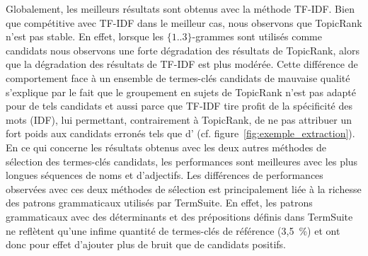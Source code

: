     Globalement, les meilleurs résultats sont obtenus avec la méthode TF-IDF.
    Bien que compétitive avec TF-IDF dans le meilleur cas, nous observons que
    TopicRank n'est pas stable. En effet, lorsque les $\{1..3\}$-grammes sont
    utilisés comme candidats nous observons une forte dégradation des résultats
    de TopicRank, alors que la dégradation des résultats de TF-IDF est plus
    modérée. Cette différence de comportement face à un ensemble de termes-clés
    candidats de mauvaise qualité s'explique par le fait que le groupement en
    sujets de TopicRank n'est pas adapté pour de tels candidats et aussi parce
    que TF-IDF tire profit de la spécificité des mots (IDF), lui permettant,
    contrairement à TopicRank, de ne pas attribuer un fort poids aux candidats
    erronés tels que \og{}d'\fg{} (cf. figure~\ref{fig:exemple_extraction}). En
    ce qui concerne les résultats obtenus avec les deux autres méthodes de
    sélection des termes-clés candidats, les performances sont meilleures avec
    les plus longues séquences de noms et d'adjectifs. Les différences de
    performances observées avec ces deux méthodes de sélection est
    principalement liée à la richesse des patrons grammaticaux utilisés par
    TermSuite. En effet, les patrons grammaticaux avec des déterminants et des
    prépositions définis dans TermSuite ne reflètent qu'une infime quantité de
    termes-clés de référence (3,5~\%) et ont donc pour effet d'ajouter plus de
    bruit que de candidats positifs.
